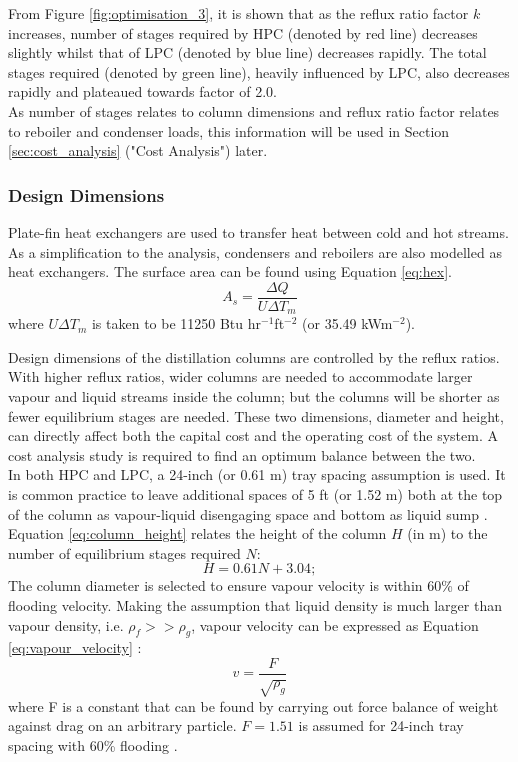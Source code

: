 	\noindent From Figure \ref{fig:optimisation_3}, it is shown that as the reflux ratio factor $k$ increases, number of stages required by HPC (denoted by red line) decreases slightly whilst that of LPC (denoted by blue line) decreases rapidly. The total stages required (denoted by green line), heavily influenced by LPC, also decreases rapidly and plateaued towards factor of 2.0. \\
	As number of stages relates to column dimensions and reflux ratio factor relates to reboiler and condenser loads, this information will be used in Section \ref{sec:cost_analysis} ("Cost Analysis") later.
    \subsubsection{Design Dimensions} \noindent
		Plate-fin heat exchangers are used to transfer heat between cold and hot streams. As a simplification to the analysis, condensers and reboilers are also modelled as heat exchangers. The surface area can be found using Equation \ref{eq:hex}.
		\begin{equation}
		    A_s = \frac{\Delta Q}{U\Delta T_m}
		    \label{eq:hex}
		\end{equation} 
		where $U\Delta T_m$ is taken to be 11250 Btu hr$^{-1}$ft$^{-2}$ (or 35.49 kWm$^{-2}$).
		
		Design dimensions of the distillation columns are controlled by the reflux ratios. With higher reflux ratios, wider columns are needed to accommodate larger vapour and liquid streams inside the column; but the columns will be shorter as fewer equilibrium stages are needed. These two dimensions, diameter and height, can directly affect both the capital cost and the operating cost of the system. A cost analysis study is required to find an optimum balance between the two. \\
		
		\noindent In both HPC and LPC, a 24-inch (or 0.61 m) tray spacing assumption is used. It is common practice to leave additional spaces of 5 ft (or 1.52 m) both at the top of the column as vapour-liquid disengaging space and bottom as liquid sump \citep{douglas1988}. Equation \ref{eq:column_height} relates the height of the column $H$ (in m) to the number of equilibrium stages required $N$:
		\begin{equation}
		    H = 0.61N + 3.04;
		    \label{eq:column_height}
		\end{equation}
		The column diameter is selected to ensure vapour velocity is within 60\% of flooding velocity. Making the assumption that liquid density is much larger than vapour density, i.e. $\rho_f >> \rho_g$, vapour velocity can be expressed as Equation \ref{eq:vapour_velocity} \citep{douglas1988}:
		\begin{equation}
		    v = \frac{F}{\sqrt{\rho_g}}
		    \label{eq:vapour_velocity}
		\end{equation}
		where F is a constant that can be found by carrying out force balance of weight against drag on an arbitrary particle. $F = 1.51$ is assumed for 24-inch tray spacing with 60\% flooding \citep{perry2007}. \\
		

